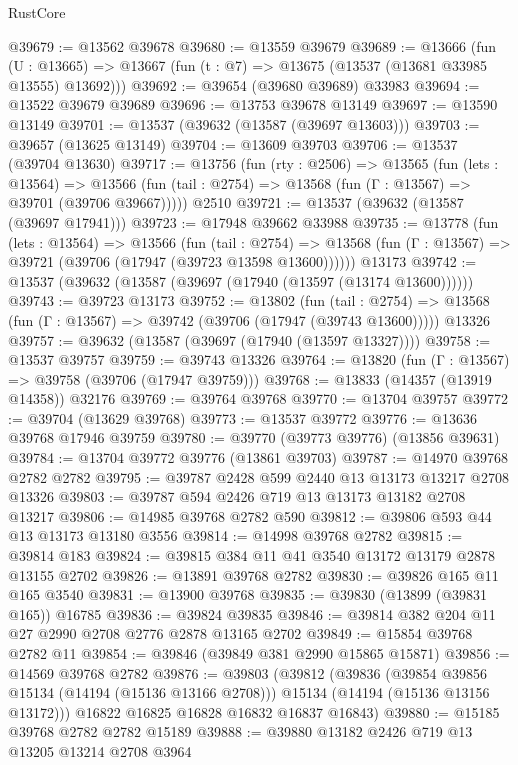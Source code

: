 \begin{lexlean}{RustCore}
\begin{coremodule}
@39679 := @13562 @39678
@39680 := @13559 @39679
@39689 := @13666
    (fun (U : @13665) => @13667 (fun (t : @7) => @13675 (@13537 (@13681 @33985 @13555) @13692)))
@39692 := @39654 (@39680 @39689) @33983
@39694 := @13522 @39679 @39689
@39696 := @13753 @39678 @13149
@39697 := @13590 @13149
@39701 := @13537 (@39632 (@13587 (@39697 @13603)))
@39703 := @39657 (@13625 @13149)
@39704 := @13609 @39703
@39706 := @13537 (@39704 @13630)
@39717 := @13756
    (fun (rty : @2506) =>
    @13565
      (fun (lets : @13564) =>
      @13566 (fun (tail : @2754) => @13568 (fun (Γ : @13567) => @39701 (@39706 @39667)))))
    @2510
@39721 := @13537 (@39632 (@13587 (@39697 @17941)))
@39723 := @17948 @39662 @33988
@39735 := @13778
    (fun (lets : @13564) =>
    @13566
      (fun (tail : @2754) =>
      @13568 (fun (Γ : @13567) => @39721 (@39706 (@17947 (@39723 @13598 @13600))))))
    @13173
@39742 := @13537 (@39632 (@13587 (@39697 (@17940 (@13597 (@13174 @13600))))))
@39743 := @39723 @13173
@39752 := @13802
    (fun (tail : @2754) => @13568 (fun (Γ : @13567) => @39742 (@39706 (@17947 (@39743 @13600)))))
    @13326
@39757 := @39632 (@13587 (@39697 (@17940 (@13597 @13327))))
@39758 := @13537 @39757
@39759 := @39743 @13326
@39764 := @13820 (fun (Γ : @13567) => @39758 (@39706 (@17947 @39759)))
@39768 := @13833 (@14357 (@13919 @14358)) @32176
@39769 := @39764 @39768
@39770 := @13704 @39757
@39772 := @39704 (@13629 @39768)
@39773 := @13537 @39772
@39776 := @13636 @39768 @17946 @39759
@39780 := @39770 (@39773 @39776) (@13856 @39631)
@39784 := @13704 @39772 @39776 (@13861 @39703)
@39787 := @14970 @39768 @2782 @2782
@39795 := @39787 @2428 @599 @2440 @13 @13173 @13217 @2708 @13326
@39803 := @39787 @594 @2426 @719 @13 @13173 @13182 @2708 @13217
@39806 := @14985 @39768 @2782 @590
@39812 := @39806 @593 @44 @13 @13173 @13180 @3556
@39814 := @14998 @39768 @2782
@39815 := @39814 @183
@39824 := @39815 @384 @11 @41 @3540 @13172 @13179 @2878 @13155 @2702
@39826 := @13891 @39768 @2782
@39830 := @39826 @165 @11 @165 @3540
@39831 := @13900 @39768
@39835 := @39830 (@13899 (@39831 @165)) @16785
@39836 := @39824 @39835
@39846 := @39814 @382 @204 @11 @27 @2990 @2708 @2776 @2878 @13165 @2702
@39849 := @15854 @39768 @2782 @11
@39854 := @39846 (@39849 @381 @2990 @15865 @15871)
@39856 := @14569 @39768 @2782
@39876 := @39803
    (@39812
      (@39836
        (@39854 @39856 @15134 (@14194 (@15136 @13166 @2708)))
        @15134
        (@14194 (@15136 @13156 @13172)))
      @16822
      @16825
      @16828
      @16832
      @16837
      @16843)
@39880 := @15185 @39768 @2782 @2782 @15189
@39888 := @39880 @13182 @2426 @719 @13 @13205 @13214 @2708 @3964

\end{coremodule}
\end{lexlean}
